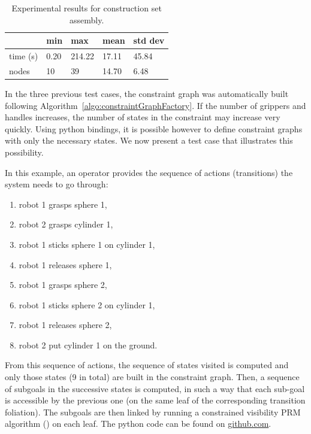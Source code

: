 \begin{table}
  \begin{center}
  \begin{tabular}{|l|l|l|l|l|}
    \hline
    & min & max & mean & std dev \\
    \hline
    time (s) & 0.20 & 214.22 & 17.11 & 45.84 \\
    nodes & 10 &  39 & 14.70 & 6.48 \\
    \hline
  \end{tabular}
  \end{center}
  \caption{Experimental results for construction set assembly.}
  \label{tab:construction-set}
\end{table}

In the three previous test cases, the constraint graph was automatically built
following Algorithm~\ref{algo:constraintGraphFactory}. If the number of grippers
and handles increases, the number of states in the constraint may increase very
quickly. Using python bindings, it is possible however to define constraint
graphs with only the necessary states. We now present a test case that
illustrates this possibility.

In this example, an operator provides the sequence of actions (transitions)
the system needs to go through:
\begin{enumerate}
\item robot 1 grasps sphere 1,
\item robot 2 grasps cylinder 1,
\item robot 1 sticks sphere 1 on cylinder 1,
\item robot 1 releases sphere 1,
\item robot 1 grasps sphere 2,
\item robot 1 sticks sphere 2 on cylinder 1,
\item robot 1 releases sphere 2,
\item robot 2 put cylinder 1 on the ground.
\end{enumerate}
From this sequence of actions, the sequence of states visited is
computed and only those states (9 in total) are built in the
constraint graph. Then, a sequence of subgoals in the successive
states is computed, in such a way that each sub-goal is accessible by
the previous one (on the same leaf of the corresponding transition
foliation). The subgoals are then linked by running a constrained visibility
PRM algorithm (\cite{SimLauNis00}) on each leaf. The python code can be found
on \href{https://github.com/humanoid-path-planner/hpp_benchmark/blob/master/2020-07-23/construction-set/script.py}{github.com}.

